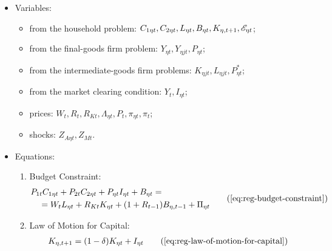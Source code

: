 \documentclass[
thesis.tex
]{subfiles}
\begin{document}
{\singlespacing
	
	\begin{itemize}

		\item Variables:
		
	\begin{itemize}
	
		\item from the household problem: $
		C_{1 \eta t}, C_{2 \eta t}, L_{\eta t}, B_{\eta t}, K_{\eta, t+1}, {\mathscr{E}_{\eta t}}$;
	
		\item from the final-goods firm problem: $Y_{\eta t}, Y_{\eta jt}, P_{\eta t}$;
	
		\item from the intermediate-goods firm problems: $K_{\eta jt}, L_{\eta jt}, P_{\eta t}^\ast$;
	
		\item from the market clearing condition: $Y_t, I_{\eta t}$;
	
		\item prices: $W_t, R_t, R_{Kt}, \Lambda_{\eta t}, P_t, \pi_{\eta t}, \pi_t$;
	
		\item shocks: $Z_{A\eta t}, Z_{Mt}$.
	
	\end{itemize}

		\item Equations:
		
	\begin{enumerate}

		\item Budget Constraint:
		\begin{align}
		\begin{split}
			& P_{1t} C_{1\eta t} + P_{2t} C_{2\eta t} + P_{\eta t} I_{\eta t} + B_{\eta t} = \\ & \quad = W_t L_{\eta t} + R_{Kt} K_{\eta t} + (1 + R_{t-1}) B_{\eta,t-1} + \Pi_{\eta t}
		\end{split} \tag{\ref{eq:reg-budget-constraint}}
		\end{align}

		\item Law of Motion for Capital:
		\begin{align}
			K_{\eta, t+1} = (1-\delta)K_{\eta t} + I_{\eta t} \tag{\ref{eq:reg-law-of-motion-for-capital}}
		\end{align}


\end{enumerate}
\end{itemize}}
\end{document}

